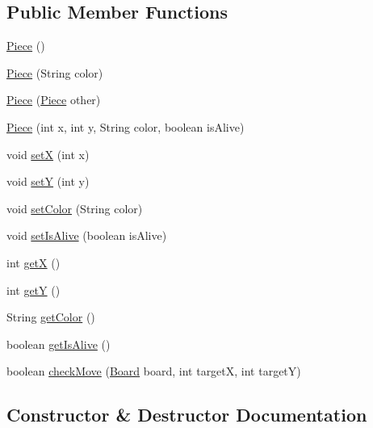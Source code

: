 \subsection*{Public Member Functions}
\begin{DoxyCompactItemize}
\item 
\hyperlink{classchess_build_1_1_piece_a41b06caa70b1b74ee4adde871cdae1d5}{Piece} ()
\item 
\hyperlink{classchess_build_1_1_piece_ab4cdefaf4be1dcb991257e94227560cf}{Piece} (String color)
\item 
\hyperlink{classchess_build_1_1_piece_a9c0143239c1c8e50aa1a26d13490b816}{Piece} (\hyperlink{classchess_build_1_1_piece}{Piece} other)
\item 
\hyperlink{classchess_build_1_1_piece_a8b3114c959f347293be11e115a0ceada}{Piece} (int x, int y, String color, boolean is\+Alive)
\item 
void \hyperlink{classchess_build_1_1_piece_abcd8667e17514a6dcd27c3bd18e41279}{setX} (int x)
\item 
void \hyperlink{classchess_build_1_1_piece_a3d591027929747d1d2436a702ef15e3d}{setY} (int y)
\item 
void \hyperlink{classchess_build_1_1_piece_a06fc50dacba109b1a3903045f33dd61a}{set\+Color} (String color)
\item 
void \hyperlink{classchess_build_1_1_piece_a15d7482399188a3635f13b11c4a57d1a}{set\+Is\+Alive} (boolean is\+Alive)
\item 
int \hyperlink{classchess_build_1_1_piece_a5d9d98f556141604bbef630597474e42}{getX} ()
\item 
int \hyperlink{classchess_build_1_1_piece_a3c6c4ce7aec8f7c4e802aeee92aa7830}{getY} ()
\item 
String \hyperlink{classchess_build_1_1_piece_a2ed07d6f74a8a36955faad7cbf197348}{get\+Color} ()
\item 
boolean \hyperlink{classchess_build_1_1_piece_a19f95de8f94f11b84a7e1b0a1261825c}{get\+Is\+Alive} ()
\item 
boolean \hyperlink{classchess_build_1_1_piece_a7f4903f049048556c3eb7441259719c0}{check\+Move} (\hyperlink{classchess_build_1_1_board}{Board} board, int targetX, int targetY)
\end{DoxyCompactItemize}


\subsection{Constructor \& Destructor Documentation}
\mbox{\label{classchess_build_1_1_piece_a41b06caa70b1b74ee4adde871cdae1d5}} 

